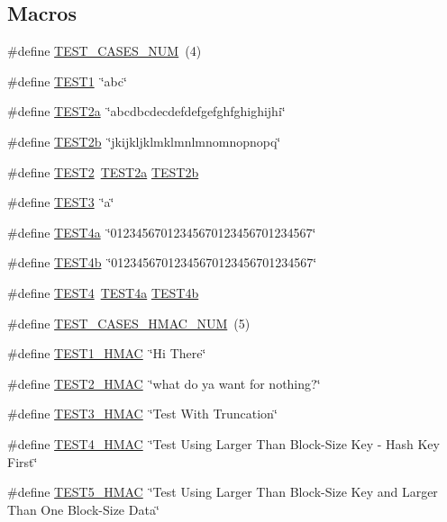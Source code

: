 \subsection*{Macros}
\begin{DoxyCompactItemize}
\item 
\#define \hyperlink{tests-hashes-sha1_8c_a980428b3085b33ec46312fe0f3cb57b4}{T\+E\+S\+T\+\_\+\+C\+A\+S\+E\+S\+\_\+\+N\+UM}~(4)
\item 
\#define \hyperlink{tests-hashes-sha1_8c_aef8471770769d5643c8d0e9d49de0678}{T\+E\+S\+T1}~\char`\"{}abc\char`\"{}
\item 
\#define \hyperlink{tests-hashes-sha1_8c_a199333d354e3c1f5fc4dd571284fdd7d}{T\+E\+S\+T2a}~\char`\"{}abcdbcdecdefdefgefghfghighijhi\char`\"{}
\item 
\#define \hyperlink{tests-hashes-sha1_8c_a20a905eeace7ee3234ac0f352991d698}{T\+E\+S\+T2b}~\char`\"{}jkijkljklmklmnlmnomnopnopq\char`\"{}
\item 
\#define \hyperlink{tests-hashes-sha1_8c_a1b5997c11166c594b80d44bfde1cfa9c}{T\+E\+S\+T2}~\hyperlink{tests-hashes-sha1_8c_a199333d354e3c1f5fc4dd571284fdd7d}{T\+E\+S\+T2a} \hyperlink{tests-hashes-sha1_8c_a20a905eeace7ee3234ac0f352991d698}{T\+E\+S\+T2b}
\item 
\#define \hyperlink{tests-hashes-sha1_8c_a4671cc5352089a85a3b62399fd09099d}{T\+E\+S\+T3}~\char`\"{}a\char`\"{}
\item 
\#define \hyperlink{tests-hashes-sha1_8c_adac545ef2463994bbf27a39f2eae4706}{T\+E\+S\+T4a}~\char`\"{}01234567012345670123456701234567\char`\"{}
\item 
\#define \hyperlink{tests-hashes-sha1_8c_ada1e800575402b797af4de598255aac1}{T\+E\+S\+T4b}~\char`\"{}01234567012345670123456701234567\char`\"{}
\item 
\#define \hyperlink{tests-hashes-sha1_8c_a48a5cfeeedd2a33c0cc9bf96155603fe}{T\+E\+S\+T4}~\hyperlink{tests-hashes-sha1_8c_adac545ef2463994bbf27a39f2eae4706}{T\+E\+S\+T4a} \hyperlink{tests-hashes-sha1_8c_ada1e800575402b797af4de598255aac1}{T\+E\+S\+T4b}
\item 
\#define \hyperlink{tests-hashes-sha1_8c_a202f666594f995415c036dbe453c119f}{T\+E\+S\+T\+\_\+\+C\+A\+S\+E\+S\+\_\+\+H\+M\+A\+C\+\_\+\+N\+UM}~(5)
\item 
\#define \hyperlink{tests-hashes-sha1_8c_a64adb2d5a7abb689ffacaef002f48f72}{T\+E\+S\+T1\+\_\+\+H\+M\+AC}~\char`\"{}Hi There\char`\"{}
\item 
\#define \hyperlink{tests-hashes-sha1_8c_a2a3075ba5d6b067488617c91ab666bd6}{T\+E\+S\+T2\+\_\+\+H\+M\+AC}~\char`\"{}what do ya want for nothing?\char`\"{}
\item 
\#define \hyperlink{tests-hashes-sha1_8c_ae910f65fed01cd0bef78c1831442fae5}{T\+E\+S\+T3\+\_\+\+H\+M\+AC}~\char`\"{}Test With Truncation\char`\"{}
\item 
\#define \hyperlink{tests-hashes-sha1_8c_afd4689334b6359413f57a5417b15551b}{T\+E\+S\+T4\+\_\+\+H\+M\+AC}~\char`\"{}Test Using Larger Than Block-\/Size Key -\/ Hash Key First\char`\"{}
\item 
\#define \hyperlink{tests-hashes-sha1_8c_ae9d58987eb9e323f8958a26fcdbeb9ef}{T\+E\+S\+T5\+\_\+\+H\+M\+AC}~\char`\"{}Test Using Larger Than Block-\/Size Key and Larger Than One Block-\/Size Data\char`\"{}
\end{DoxyCompactItemize}
